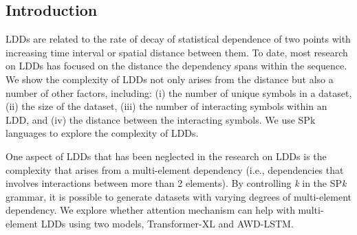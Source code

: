 \documentclass[a0,portrait]{a0poster}
\begin{document}
\begin{multicols}{2}


%
%


\section*{Introduction}

LDDs are related to the rate of decay of statistical dependence of two points with increasing time interval or spatial distance between them. To date, most research on LDDs has focused on the distance the dependency spans within the sequence. We show the complexity of LDDs not only arises from the distance but also a number of other factors, including: (i) the number of unique symbols in a dataset, (ii) the size of the dataset, (iii) the number of interacting symbols within an LDD, and (iv) the distance between the interacting symbols. We use SPk languages to explore the complexity of LDDs.

One aspect of LDDs that has been neglected in the research on LDDs is the complexity that arises from a multi-element dependency (i.e., dependencies that involves interactions between more than 2 elements). By controlling \emph{k} in the SP\emph{k} grammar, it is possible to generate datasets with varying degrees of multi-element dependency. We explore whether attention mechanism can help with multi-element LDDs using two models, Transformer-XL and AWD-LSTM.


\end{multicols}
\end{document}
